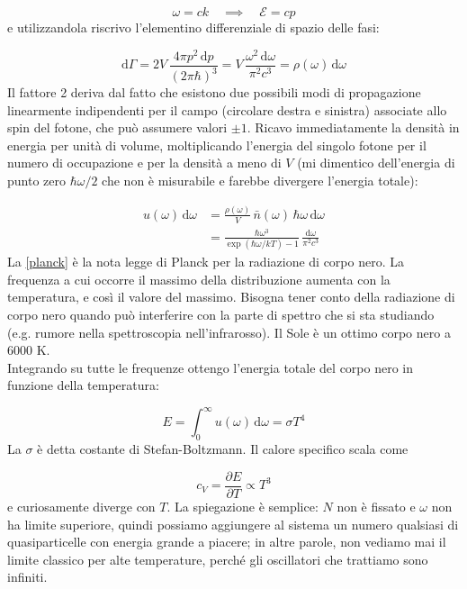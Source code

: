 \documentclass[a4paper]{report}
\begin{document}
\begin{equation}
    \omega = c k \quad\implies\quad \mathcal{E} = c p
\end{equation}
e utilizzandola riscrivo l'elementino differenziale di spazio delle fasi:

\begin{equation}
    \mathrm{d}\Gamma = 2V\,\frac{4\pi p^2\,\mathrm{d}p}{(2\pi\hbar)^3} = V\,\frac{\omega^2\,\mathrm{d}\omega}{\pi^2 c^3} = \rho(\omega)\,\mathrm{d}\omega
\end{equation}
Il fattore 2 deriva dal fatto che esistono due possibili modi di propagazione linearmente indipendenti per il campo (circolare destra e sinistra) associate allo spin del fotone, che può assumere valori $\pm 1$. Ricavo immediatamente la densità in energia per unità di volume, moltiplicando l'energia del singolo fotone per il numero di occupazione e per la densità a meno di $V$ (mi dimentico dell'energia di punto zero $\hbar\omega/2$ che non è misurabile e farebbe divergere l'energia totale):

\begin{equation}
    \begin{split}
        u(\omega)\,\mathrm{d}\omega & = \frac{\rho(\omega)}{V}\,\bar{n}(\omega)\,\hbar\omega\,\mathrm{d}\omega \\
        & = \frac{\hbar\omega^3}{\exp(\hbar\omega/k T)-1}\,\frac{\mathrm{d}\omega}{\pi^2 c^3} 
    \end{split}
    \label{planck}
\end{equation}
La \eqref{planck} è la nota legge di Planck per la radiazione di corpo nero. La frequenza a cui occorre il massimo della distribuzione aumenta con la temperatura, e così il valore del massimo. Bisogna tener conto della radiazione di corpo nero quando può interferire con la parte di spettro che si sta studiando (e.g. rumore nella spettroscopia nell'infrarosso). Il Sole è un ottimo corpo nero a 6000 K.\\
Integrando su tutte le frequenze ottengo l'energia totale del corpo nero in funzione della temperatura:

\begin{equation}
    E = \int_0^{\infty} u(\omega)\,\mathrm{d}\omega = \sigma T^4
\end{equation}
La $\sigma$ è detta costante di Stefan-Boltzmann. Il calore specifico scala come 

\begin{equation}
    c_V = \frac{\partial E}{\partial T} \propto T^3
\end{equation}
e curiosamente diverge con $T$. La spiegazione è semplice: $N$ non è fissato e $\omega$ non ha limite superiore, quindi possiamo aggiungere al sistema un numero qualsiasi di quasiparticelle con energia grande a piacere; in altre parole, non vediamo mai il limite classico per alte temperature, perché gli oscillatori che trattiamo sono infiniti. 
\end{document}
